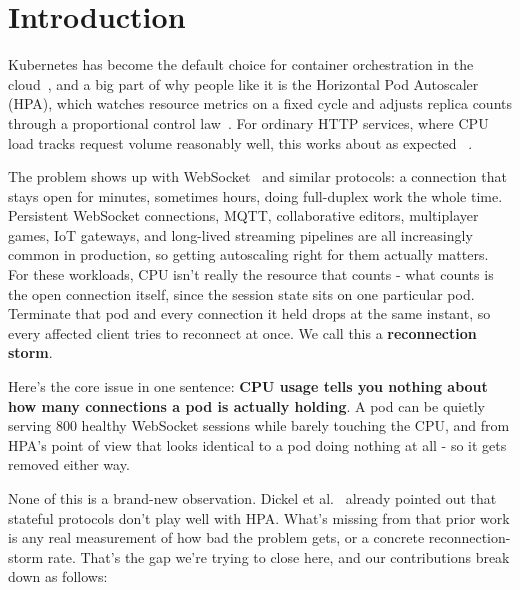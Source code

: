 \documentclass[twocolumn]{svjour3}
\begin{document}


\section{Introduction}
\label{sec:intro}

Kubernetes has become the default choice for container orchestration in the
cloud~\cite{hightower2017kubernetes,merkel2014docker}, and a big part of why people
like it is the Horizontal Pod Autoscaler (HPA), which watches resource metrics on a
fixed cycle and adjusts replica counts through a proportional control
law~\cite{k8s_hpa_docs,nguyen2020hpa,burns2016borg}. For ordinary HTTP services,
where CPU load tracks request volume reasonably well, this works about as expected
~\cite{casalicchio2017auto,lorido2014auto}.

The problem shows up with WebSocket~\cite{websocket_rfc} and similar protocols: a
connection that stays open for minutes, sometimes hours, doing full-duplex work the
whole time. Persistent WebSocket connections, MQTT, collaborative editors,
multiplayer games, IoT gateways, and long-lived streaming pipelines are all
increasingly common in production, so getting autoscaling right for them actually
matters. For these workloads, CPU isn't really the resource that counts -
what counts is the open connection itself, since the session state sits on one
particular pod. Terminate that pod and every connection it held drops at the same
instant, so every affected client tries to reconnect at once. We call this a
\textbf{reconnection storm}.

Here's the core issue in one sentence: \textbf{CPU usage tells you nothing about
how many connections a pod is actually holding}. A pod can be quietly serving 800
healthy WebSocket sessions while barely touching the CPU, and from HPA's point of
view that looks identical to a pod doing nothing at all - so it gets removed
either way.

None of this is a brand-new observation. Dickel et al.~\cite{dickel2019evaluation}
already pointed out that stateful protocols don't play well with HPA. What's
missing from that prior work is any real measurement of how bad the problem gets, or
a concrete reconnection-storm rate. That's the gap we're trying to close here, and
our contributions break down as follows:
\end{document}
